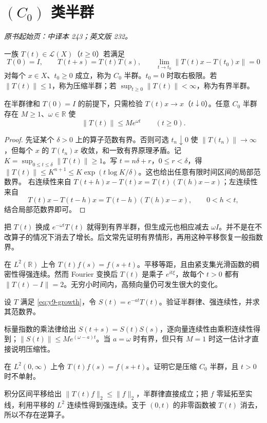 \section{\texorpdfstring{$(C_0)$}{(C0)} 类半群}\label{sec:yosida-09-01}
\noindent\textit{原书起始页：中译本 243；英文版 232。}

\begin{definition}[强连续半群]
一族 $T(t)\in\mathcal L(X)$（$t\ge0$）若满足
\[
 T(0)=I,\qquad T(t+s)=T(t)T(s),\qquad
 \lim_{t\to t_0}\|T(t)x-T(t_0)x\|=0
\]
对每个 $x\in X$、$t_0\ge0$ 成立，称为 $C_0$ 半群。$t_0=0$ 时取右极限。若 $\|T(t)\|\le1$，称为压缩半群；若 $\sup_{t\ge0}\|T(t)\|<\infty$，称为有界半群。
\end{definition}

\begin{theorem}[原点连续性与指数界]\label{thm:y9-growth}
在半群律和 $T(0)=I$ 的前提下，只需检验 $T(t)x\to x$（$t\downarrow0$）。任意 $C_0$ 半群存在 $M\ge1$、$\omega\in\mathbb R$ 使
\begin{equation}\label{eq:y9-growth}
 \|T(t)\|\le Me^{\omega t}\qquad(t\ge0).
\end{equation}
\end{theorem}
\begin{proof}
先证某个 $\delta>0$ 上的算子范数有界。否则可选 $t_n\downarrow0$ 使 $\|T(t_n)\|\to\infty$，但每个 $x$ 的 $T(t_n)x$ 收敛，和一致有界原理矛盾。记 $K=\sup_{0\le t\le\delta}\|T(t)\|\ge1$。写 $t=n\delta+r$，$0\le r<\delta$，得
$\|T(t)\|\le K^{n+1}\le K\exp(t\log K/\delta)$。这也给出任意有限时间区间的局部范数界。
右连续性来自 $T(t+h)x-T(t)x=T(t)(T(h)x-x)$；左连续性来自
\[
 T(t)x-T(t-h)x=T(t-h)(T(h)x-x),\qquad0<h<t,
\]
结合局部范数界即可。
\end{proof}

把 $T(t)$ 换成 $e^{-\omega t}T(t)$ 就得到有界半群，但生成元也相应减去 $\omega I$。并不是在不改算子的情况下消去了增长。后文常先证明有界情形，再用这种平移恢复一般指数界。

\begin{example}[强连续不要求范数连续]
在 $L^2(\mathbb R)$ 上令 $T(t)f(s)=f(s+t)$。平移等距，且由紧支集光滑函数的稠密性得强连续。然而 Fourier 变换后 $T(t)$ 是乘子 $e^{it\xi}$，故每个 $t>0$ 都有 $\|T(t)-I\|=2$。无穷小时间内，高频向量仍可发生很大的变化。
\end{example}

\begin{exercise}[改变增长率]\label{ex:y9-growth-shift}
设 $T$ 满足 \eqref{eq:y9-growth}，令 $S(t)=e^{-at}T(t)$。验证半群律、强连续性，并求其范数界。
\end{exercise}
\begin{solution}
标量指数的乘法律给出 $S(t+s)=S(t)S(s)$，逐向量连续性由乘积连续性得到；$\|S(t)\|\le Me^{(\omega-a)t}$。当 $a=\omega$ 时有界，但只有 $M=1$ 时这一估计才直接说明压缩性。
\end{solution}

\begin{exercise}[一般半群没有逆]\label{ex:y9-no-inverse}
在 $L^2(0,\infty)$ 上令 $T(t)f(s)=f(s+t)$。证明它是压缩 $C_0$ 半群，且 $t>0$ 时不单射。
\end{exercise}
\begin{solution}
积分区间平移给出 $\|T(t)f\|_2\le\|f\|_2$，半群律直接成立；把 $f$ 零延拓至实线，利用平移的 $L^2$ 连续性得到强连续。支于 $(0,t)$ 的非零函数被 $T(t)$ 消去，所以不存在逆算子。
\end{solution}
